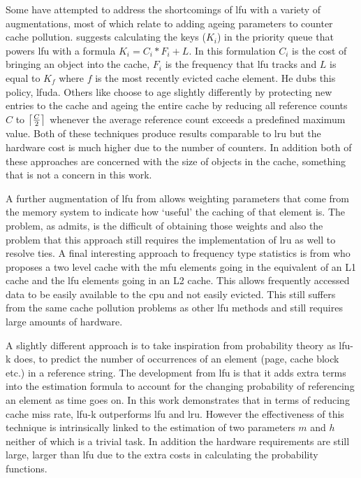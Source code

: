 Some have attempted to address the shortcomings of \gls{lfu} with a variety of augmentations, most of which relate to adding ageing parameters to counter cache pollution. \citet{arlittEvaluatingContentManagement2000} suggests calculating the keys ($K_i$) in the priority queue that powers \gls{lfu} with a formula $K_i = C_i * F_i + L$. In this formulation $C_i$ is the cost of bringing an object into the cache, $F_i$ is the frequency that \gls{lfu} tracks and $L$ is equal to $K_f$ where $f$ is the most recently evicted cache element. He dubs this policy, \gls{lfuda}. Others like \citet{robinsonDataCacheManagement1990} choose to age slightly differently by protecting new entries to the cache and ageing the entire cache by reducing all reference counts $C$ to $\ceil[\big]{\frac{C}{2}}$ whenever the average reference count exceeds a predefined maximum value. Both of these techniques produce results comparable to \gls{lru} but the hardware cost is much higher due to the number of counters. In addition both of these approaches are concerned with the size of objects in the cache, something that is not a concern in this work.

A further augmentation of \gls{lfu} from \citet{kellyVariableQosShared1999} allows weighting parameters that come from the memory system to indicate how `useful' the caching of that element is. The problem, as \citeauthor{kellyVariableQosShared1999} admits, is the difficult of obtaining those weights and also the problem that this approach still requires the implementation of \gls{lru} as well to resolve ties. A final interesting approach to frequency type statistics is from \citet{mekhielMultiLevelCacheMost29} who proposes a two level cache with the \gls{mfu} elements going in the equivalent of an L1 cache and the \gls{lfu} elements going in an L2 cache. This allows frequently accessed data to be easily available to the \gls{cpu} and not easily evicted. This still suffers from the same cache pollution problems as other \gls{lfu} methods and still requires large amounts of hardware.

A slightly different approach is to take inspiration from probability theory as \gls{lfu-k} \cite{sokolinskyLFUKEffectiveBuffer2004} does, to predict the number of occurrences of an element (page, cache block etc.) in a reference string. The development from \gls{lfu} is that it adds extra terms into the estimation formula to account for the changing probability of referencing an element as time goes on. In this work \citeauthor{sokolinskyLFUKEffectiveBuffer2004} demonstrates that in terms of reducing cache miss rate, \gls{lfu-k} outperforms \gls{lfu} and \gls{lru}. However the effectiveness of this technique is intrinsically linked to the estimation of two parameters $m$ and $h$ neither of which is a trivial task. In addition the hardware requirements are still large, larger than \gls{lfu} due to the extra costs in calculating the probability functions. 

